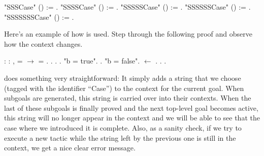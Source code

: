 \documentclass[12pt]{report}
\begin{document}
\begin{coqdoccode}
\coqdocnoindent
{} "SSSCase" () :=   .\coqdoceol
\coqdocnoindent
{} "SSSSCase" () :=   .\coqdoceol
\coqdocnoindent
{} "SSSSSCase" () :=   .\coqdoceol
\coqdocnoindent
{} "SSSSSSCase" () :=   .\coqdoceol
\coqdocnoindent
{} "SSSSSSSCase" () :=   .\coqdoceol
\end{coqdoccode}
Here's an example of how  is used.  Step through the
   following proof and observe how the context changes. \begin{coqdoccode}
\coqdocemptyline
\coqdocnoindent
{}  : \coqdockw{\ensuremath{\forall}}   : ,\coqdoceol
\coqdocindent{1.00em}
   =  \ensuremath{\rightarrow}  = .\coqdoceol
\coqdocnoindent
{}.\coqdoceol
\coqdocindent{1.00em}
   .\coqdoceol
\coqdocindent{1.00em}
 .\coqdoceol
\coqdocindent{1.00em}
 "b = true". \coqdocindent{2.00em}
.\coqdoceol
\coqdocindent{1.00em}
 "b = false". \coqdocindent{2.00em}
 \ensuremath{\leftarrow} .\coqdoceol
\coqdocindent{2.00em}
.\coqdoceol
\coqdocnoindent
{}.\coqdoceol
\coqdocemptyline
\end{coqdoccode}
 does something very straightforward: It simply adds a
    string that we choose (tagged with the identifier ``Case'') to the
    context for the current goal.  When subgoals are generated, this
    string is carried over into their contexts.  When the last of
    these subgoals is finally proved and the next top-level goal
    becomes active, this string will no longer appear in the context
    and we will be able to see that the case where we introduced it is
    complete.  Also, as a sanity check, if we try to execute a new
     tactic while the string left by the previous one is still
    in the context, we get a nice clear error message.
\end{document}
